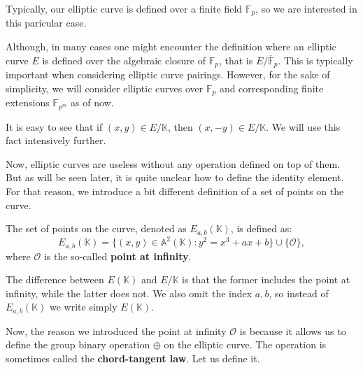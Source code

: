 \documentclass[../lecture-notes.tex]{subfiles}
\begin{document}
Typically, our elliptic curve is defined over a finite field $\mathbb{F}_p$, so we are interested in this paricular case. 

\begin{remark}
    Although, in many cases one might encounter the definition where an elliptic curve $E$ is defined over the algebraic closure of $\mathbb{F}_p$, that is $E/\overline{\mathbb{F}}_p$. This is typically important when considering elliptic curve pairings. However, for the sake of simplicity, we will consider elliptic curves over $\mathbb{F}_p$ and corresponding finite extensions $\mathbb{F}_{p^m}$ as of now.
\end{remark}

\begin{remark}
    It is easy to see that if $(x,y) \in E/\mathbb{K}$, then $(x,-y) \in E/\mathbb{K}$. We will use this fact intensively further.
\end{remark}

Now, elliptic curves are useless without any operation defined on top of them. But as will be seen later, it is quite unclear how to define the identity element. For that reason, we introduce a bit different definition of a set of points on the curve.

\begin{definition}
    The set of points on the curve, denoted as $E_{a,b}(\mathbb{K})$, is defined as:
    \begin{equation}
        E_{a,b}(\mathbb{K}) = \{(x,y) \in \mathbb{A}^2(\mathbb{K}): y^2=x^3+ax+b\} \cup \{\mathcal{O}\},
    \end{equation}
    where $\mathcal{O}$ is the so-called \textbf{point at infinity}.
\end{definition}

\begin{remark}
    The difference between $E(\mathbb{K})$ and $E/\mathbb{K}$ is that the former includes the point at infinity, while the latter does not. We also omit the index $a,b$, so instead of $E_{a,b}(\mathbb{K})$ we write simply $E(\mathbb{K})$.
\end{remark}

Now, the reason we introduced the point at infinity $\mathcal{O}$ is because it allows us to define the group binary operation $\oplus$ on the elliptic curve. The operation is sometimes called the \textbf{chord-tangent law}. Let us define it.
\end{document}
